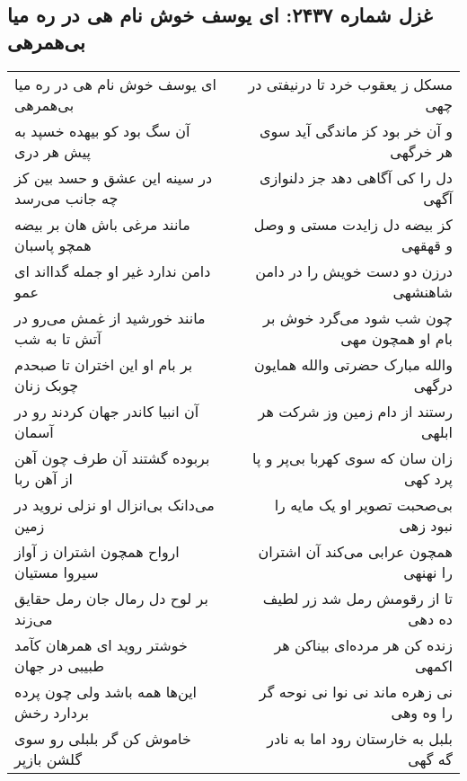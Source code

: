 \begin{center}
\section*{غزل شماره ۲۴۳۷: ای یوسف خوش نام هی در ره میا بی‌همرهی}
\label{sec:2437}
\begin{longtable}{l p{0.5cm} r}
ای یوسف خوش نام هی در ره میا بی‌همرهی
&&
مسکل ز یعقوب خرد تا درنیفتی در چهی
\\
آن سگ بود کو بیهده خسپد به پیش هر دری
&&
و آن خر بود کز ماندگی آید سوی هر خرگهی
\\
در سینه این عشق و حسد بین کز چه جانب می‌رسد
&&
دل را کی آگاهی دهد جز دلنوازی آگهی
\\
مانند مرغی باش هان بر بیضه همچو پاسبان
&&
کز بیضه دل زایدت مستی و وصل و قهقهی
\\
دامن ندارد غیر او جمله گدااند ای عمو
&&
درزن دو دست خویش را در دامن شاهنشهی
\\
مانند خورشید از غمش می‌رو در آتش تا به شب
&&
چون شب شود می‌گرد خوش بر بام او همچون مهی
\\
بر بام او این اختران تا صبحدم چوبک زنان
&&
والله مبارک حضرتی والله همایون درگهی
\\
آن انبیا کاندر جهان کردند رو در آسمان
&&
رستند از دام زمین وز شرکت هر ابلهی
\\
بربوده گشتند آن طرف چون آهن از آهن ربا
&&
زان سان که سوی کهربا بی‌پر و پا پرد کهی
\\
می‌دانک بی‌انزال او نزلی نروید در زمین
&&
بی‌صحبت تصویر او یک مایه را نبود زهی
\\
ارواح همچون اشتران ز آواز سیروا مستیان
&&
همچون عرابی می‌کند آن اشتران را نهنهی
\\
بر لوح دل رمال جان رمل حقایق می‌زند
&&
تا از رقومش رمل شد زر لطیف ده دهی
\\
خوشتر روید ای همرهان کآمد طبیبی در جهان
&&
زنده کن هر مرده‌ای بیناکن هر اکمهی
\\
این‌ها همه باشد ولی چون پرده بردارد رخش
&&
نی زهره ماند نی نوا نی نوحه گر را وه وهی
\\
خاموش کن گر بلبلی رو سوی گلشن بازپر
&&
بلبل به خارستان رود اما به نادر گه گهی
\\
\end{longtable}
\end{center}
